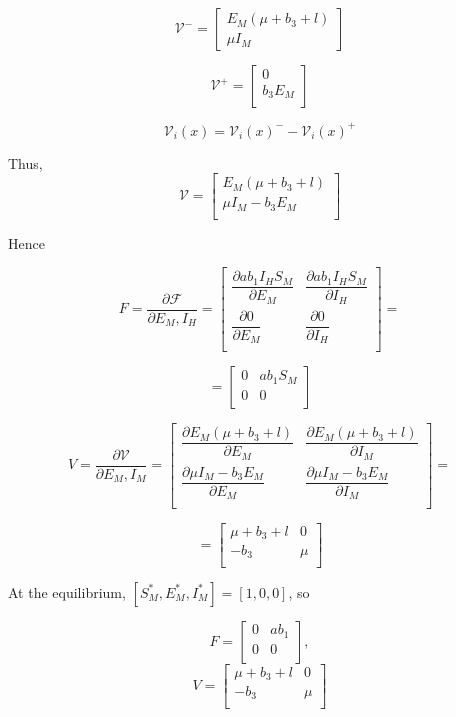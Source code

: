 \documentclass[a4paper,fleqn]{cas-dc}
\begin{document}
\begin{itemize}
$$
{\mathcal V^-} = \begin{bmatrix}
E_M (\mu + b_3 + l)\\
\mu I_M
\end{bmatrix}
$$

$$
{\mathcal V^+} = \begin{bmatrix}
0\\
b_3 E_M\\
\end{bmatrix}
$$

$${\mathcal V}_i (x) = {\mathcal V}_i(x)^{-} - {\mathcal V}_i(x)^+$$

Thus,
$$
{\mathcal V} =
\begin{bmatrix}
E_M (\mu + b_3 + l)\\
\mu I_M - b_3 E_M\\
\end{bmatrix}
$$

Hence

$$ F = \dfrac{\partial{\mathcal F}}{\partial E_M, I_H} =
\begin{bmatrix}
\dfrac{\partial ab_1 I_H S_M}{\partial E_M} & \dfrac{\partial ab_1 I_H S_M}{\partial I_H}\\
\dfrac{\partial 0}{\partial E_M} & \dfrac{\partial 0}{\partial I_H}\\
\end{bmatrix} = 
$$

$$
= \begin{bmatrix}
0 & ab_1 S_M\\
0 & 0\\
\end{bmatrix}$$

$$ V = \dfrac{\partial{\mathcal V}}{\partial E_M, I_M} =
\begin{bmatrix}
\dfrac{\partial E_M (\mu + b_3 + l)}{\partial E_M} & \dfrac{\partial E_M (\mu + b_3 + l)}{\partial I_M}\\
\dfrac{\partial \mu I_M - b_3 E_M}{\partial E_M} & \dfrac{\partial \mu I_M - b_3 E_M}{\partial I_M}\\
\end{bmatrix} = 
$$

$$
=\begin{bmatrix}
\mu+b_3+l & 0\\
- b_3 & \mu\\
\end{bmatrix}$$

At the equilibrium, $[S_M^*, E_M^*, I_M^*] = [1,0,0]$, so 

$$F=\begin{bmatrix}
0 & ab_1\\
0 & 0\\
\end{bmatrix},$$
$$V = \begin{bmatrix}
\mu+b_3+l & 0\\
- b_3 & \mu\\
\end{bmatrix}$$ 


\end{itemize}
\end{document}

